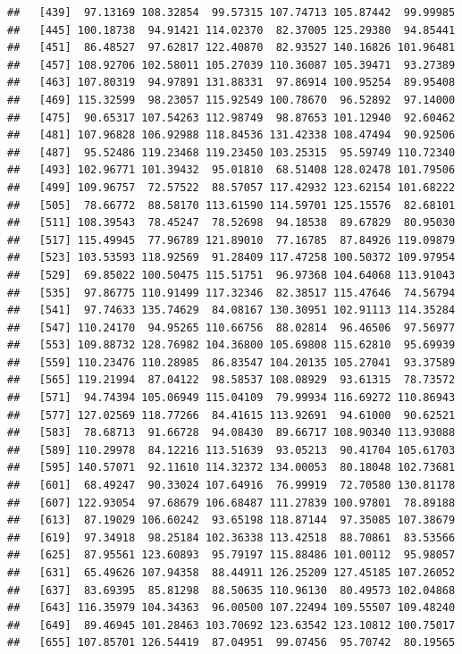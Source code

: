 \documentclass[
]{article}
\begin{document}
\begin{verbatim}
##   [439]  97.13169 108.32854  99.57315 107.74713 105.87442  99.99985
##   [445] 100.18738  94.91421 114.02370  82.37005 125.29380  94.85441
##   [451]  86.48527  97.62817 122.40870  82.93527 140.16826 101.96481
##   [457] 108.92706 102.58011 105.27039 110.36087 105.39471  93.27389
##   [463] 107.80319  94.97891 131.88331  97.86914 100.95254  89.95408
##   [469] 115.32599  98.23057 115.92549 100.78670  96.52892  97.14000
##   [475]  90.65317 107.54263 112.98749  98.87653 101.12940  92.60462
##   [481] 107.96828 106.92988 118.84536 131.42338 108.47494  90.92506
##   [487]  95.52486 119.23468 119.23450 103.25315  95.59749 110.72340
##   [493] 102.96771 101.39432  95.01810  68.51408 128.02478 101.79506
##   [499] 109.96757  72.57522  88.57057 117.42932 123.62154 101.68222
##   [505]  78.66772  88.58170 113.61590 114.59701 125.15576  82.68101
##   [511] 108.39543  78.45247  78.52698  94.18538  89.67829  80.95030
##   [517] 115.49945  77.96789 121.89010  77.16785  87.84926 119.09879
##   [523] 103.53593 118.92569  91.28409 117.47258 100.50372 109.97954
##   [529]  69.85022 100.50475 115.51751  96.97368 104.64068 113.91043
##   [535]  97.86775 110.91499 117.32346  82.38517 115.47646  74.56794
##   [541]  97.74633 135.74629  84.08167 130.30951 102.91113 114.35284
##   [547] 110.24170  94.95265 110.66756  88.02814  96.46506  97.56977
##   [553] 109.88732 128.76982 104.36800 105.69808 115.62810  95.69939
##   [559] 110.23476 110.28985  86.83547 104.20135 105.27041  93.37589
##   [565] 119.21994  87.04122  98.58537 108.08929  93.61315  78.73572
##   [571]  94.74394 105.06949 115.04109  79.99934 116.69272 110.86943
##   [577] 127.02569 118.77266  84.41615 113.92691  94.61000  90.62521
##   [583]  78.68713  91.66728  94.08430  89.66717 108.90340 113.93088
##   [589] 110.29978  84.12216 113.51639  93.05213  90.41704 105.61703
##   [595] 140.57071  92.11610 114.32372 134.00053  80.18048 102.73681
##   [601]  68.49247  90.33024 107.64916  76.99919  72.70580 130.81178
##   [607] 122.93054  97.68679 106.68487 111.27839 100.97801  78.89188
##   [613]  87.19029 106.60242  93.65198 118.87144  97.35085 107.38679
##   [619]  97.34918  98.25184 102.36338 113.42518  88.70861  83.53566
##   [625]  87.95561 123.60893  95.79197 115.88486 101.00112  95.98057
##   [631]  65.49626 107.94358  88.44911 126.25209 127.45185 107.26052
##   [637]  83.69395  85.81298  88.50635 110.96130  80.49573 102.04868
##   [643] 116.35979 104.34363  96.00500 107.22494 109.55507 109.48240
##   [649]  89.46945 101.28463 103.70692 123.63542 123.10812 100.75017
##   [655] 107.85701 126.54419  87.04951  99.07456  95.70742  80.19565

\end{verbatim}
\end{document}
